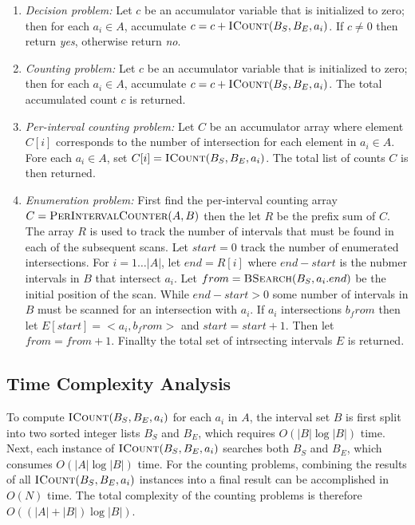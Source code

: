 \documentclass{bioinfo}
\begin{document}
	\begin{enumerate}

		\item
		{\em Decision problem:} Let $c$ be an accumulator variable that is
		initialized to zero; then for each $a_i \in A$, accumulate $c = c +
		\textsc{ICount}(B_S,B_E,a_i)$.  If $c\ne0$ then return {\em yes}, otherwise
		return {\em no}.

		\item
		{\em Counting problem:}  Let $c$ be an accumulator variable that is
		initialized to zero; then for each $a_i \in A$, accumulate $c = c +
		\textsc{ICount}(B_S,B_E,a_i)$.  The total accumulated count $c$ is returned.

		\item
		{\em Per-interval counting problem:} Let $C$ be an accumulator
		array where element $C[i]$ corresponds to the number of
		intersection for each element in $a_i\in A$.  Fore each $a_i \in A$,
		set $C[i]=\textsc{ICount}(B_S,B_E,a_i)$.  The total list of counts $C$ is then
		returned.

		\item
		{\em Enumeration problem:}
		First find the per-interval counting array $C=\textsc{PerIntervalCounter}(A,B)$
		then the let $R$ be the prefix sum of $C$. The array $R$ is used to track the
		number of intervals that must be found in each of the subsequent scans.  Let
		$start = 0$ track the number of enumerated intersections.
		For $i=1\dots|A|$, let $end = R[i]$ where $end - start$ is the nubmer intervals
		in $B$ that intersect $a_i$.  Let $from=\textsc{BSearch}(B_S, a_i.end)$ be
		the initial position of the scan.  While $end - start > 0$ some number of
		intervals in $B$ must be scanned for an intersection with $a_i$.  If $a_i$
		intersections $b_from$ then let $E[start] = <a_i, b_from>$ and 
		$start=start+1$.  Then let $from = from +1$.  Finallty the total set of
		intrsecting intervals $E$ is returned.
	\end{enumerate}

	\subsection{Time Complexity Analysis}

	To compute $\textsc{ICount}(B_S,B_E,a_i)$ for each $a_i$ in $A$, the interval
	set $B$ is first split into two sorted integer lists $B_S$ and $B_E$,
	which requires $O(|B| \log |B|)$ time.  Next, each instance of
	$\textsc{ICount}(B_S,B_E,a_i)$ searches both $B_S$ and $B_E$, which consumes
	$O(|A| \log |B|)$ time.  For the counting problems, combining the
	results of all $\textsc{ICount}(B_S,B_E,a_i)$ instances into a final result can
	be accomplished in $O(N)$ time.  The total complexity of the counting
	problems is therefore $O((|A| + |B|) \log |B|)$.
\end{document}
